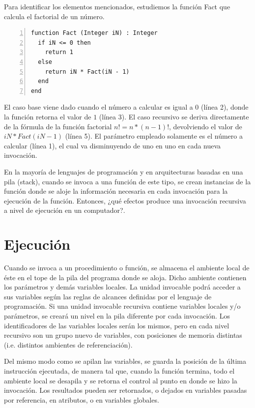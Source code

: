 Para identificar los elementos mencionados, estudiemos la función Fact que calcula el factorial de un número.

\begin{lstlisting}[upquote=true, numbers=left, language=pseudo]
function Fact (Integer iN) : Integer
  if iN <= 0 then
    return 1
  else
    return iN * Fact(iN - 1)
  end
end
\end{lstlisting}

El caso base viene dado cuando el número a calcular es igual a $0$ (línea 2), donde la función retorna el valor de $1$ (línea 3). El caso recursivo se deriva directamente de la fórmula de la función factorial $n! = n*(n-1)!$, devolviendo el valor de $iN * Fact(iN -1)$ (línea 5). El parámetro empleado solamente es el número a calcular (línea 1), el cual va disminuyendo de uno en uno en cada nueva invocación.

En la mayoría de lenguajes de programación y en arquitecturas basadas en una pila (stack), cuando se invoca a una función de este tipo, se crean instancias de la función donde se aloje la información necesaria en cada invocación para la ejecución de la función. Entonces, ¿qué efectos produce una invocación recursiva a nivel de ejecución en un computador?.

\section{Ejecución}

Cuando se invoca a un procedimiento o función, se almacena el ambiente local de éste en el tope de la pila del programa donde se aloja. Dicho ambiente contienen los parámetros y demás variables locales. La unidad invocable podrá acceder a sus variables según las reglas de alcances definidas por el lenguaje de programación. Si una unidad invocable recursiva contiene variables locales y/o parámetros, se creará un nivel en la pila diferente por cada invocación. Los identificadores de las variables locales serán los mismos, pero en cada nivel recursivo son un grupo nuevo de variables, con posiciones de memoria distintas (i.e. distintos ambientes de referenciación).

Del mismo modo como se apilan las variables, se guarda la posición de la última instrucción ejecutada, de manera tal que, cuando la función termina, todo el ambiente local se desapila y se retorna el control al punto en donde se hizo la invocación. Los resultados pueden ser retornados, o dejados en variables pasadas por referencia, en atributos, o en variables globales.


